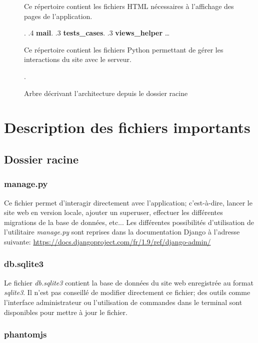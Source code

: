 \begin{figure}[!ht]
\begin{framed}
{\begin{minipage}[t]{10cm}
									Ce répertoire contient les fichiers
									HTML nécessaires à l'affichage des pages
									de l'application{.}
									\end{minipage}.
			.4 \textbf{mail}.
			.3 \textbf{tests\_cases}.
			.3 \textbf{views\_helper} \ldots{} \begin{minipage}[t]{10cm}
									Ce répertoire contient les fichiers
									Python permettant de gérer les interactions
									du site avec le serveur{.}
									\end{minipage}.
		}
	\end{framed}
	\caption{Arbre décrivant l'architecture depuis le dossier racine}
	\label{fig:Architecture des dossiers}
\end{figure}
\FloatBarrier

\section{Description des fichiers importants}

\subsection{Dossier racine}

\subsubsection{manage.py}

Ce fichier permet d'interagir directement avec l'application; c'est-à-dire, lancer le site web en version locale, ajouter un superuser, effectuer les différentes migrations de la base de données, etc... Les différentes possibilités d'utilisation de l'utilitaire \textit{manage.py} sont reprises dans la documentation Django à l'adresse suivante: \url{https://docs.djangoproject.com/fr/1.9/ref/django-admin/}

\subsubsection{db.sqlite3}

Le fichier \textit{db.sqlite3} contient la base de données du site web enregistrée au format \textit{sqlite3}. Il n'est pas conseillé de modifier directement ce fichier; des outils comme l'interface administrateur ou l'utilisation de commandes dans le terminal sont disponibles pour mettre à jour le fichier.

\subsubsection{phantomjs}

